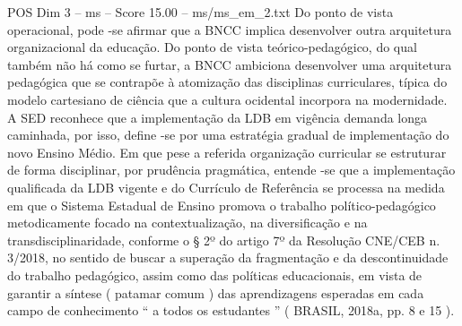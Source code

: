 \begin{textsample}{POS Dim 3 – ms – Score 15.00 – ms/ms\_em\_2.txt}
Do ponto de vista operacional, pode -se afirmar que a BNCC implica desenvolver outra arquitetura organizacional da educação.
Do ponto de vista teórico-pedagógico, do qual também não há como se furtar, a BNCC ambiciona desenvolver uma arquitetura pedagógica que se contrapõe à atomização das disciplinas curriculares, típica do modelo cartesiano de ciência que a cultura ocidental incorpora na modernidade.
A SED reconhece que a implementação da LDB em vigência demanda longa caminhada, por isso, define -se por uma estratégia gradual de implementação do novo Ensino Médio.
Em que pese a referida organização curricular se estruturar de forma disciplinar, por prudência pragmática, entende -se que a implementação qualificada da LDB vigente e do Currículo de Referência se processa na medida em que o Sistema Estadual de Ensino promova o trabalho político-pedagógico metodicamente focado na contextualização, na diversificação e na transdisciplinaridade, conforme o § 2º do artigo 7º da Resolução CNE/CEB n. 3/2018, no sentido de buscar a superação da fragmentação e da descontinuidade do trabalho pedagógico, assim como das políticas educacionais, em vista de garantir a síntese ( patamar comum ) das aprendizagens esperadas em cada campo de conhecimento “ a todos os estudantes ” ( BRASIL, 2018a, pp. 8 e 15 ).

\end{textsample}
